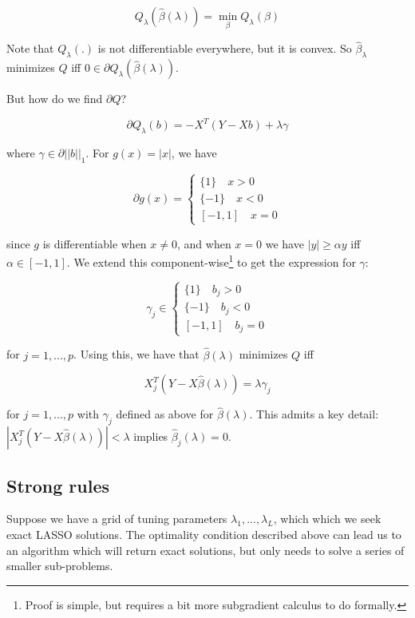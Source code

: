 \documentclass{amsart}
\begin{document}
$$Q_\lambda(\hat{\beta}(\lambda)) = \min_{\beta}Q_{\lambda}(\beta)$$

Note that $Q_{\lambda}(.)$ is not differentiable everywhere, but it is convex.
So $\hat{\beta}_{\lambda}$ minimizes $Q$ iff $0 \in \partial
Q_{\lambda}(\hat{\beta}(\lambda))$. 

\bigskip

But how do we find $\partial Q$?

$$\partial Q_{\lambda}(b) = -X^T(Y - Xb) + \lambda \gamma$$

where $\gamma \in \partial ||b||_1$. For $g(x) = |x|$, we have 

$$\partial g (x) = \begin{cases}
	\{ 1 \} \quad x > 0 \\
	\{ -1 \} \quad x < 0 \\
	[-1,1] \quad x = 0
\end{cases}$$

since $g$ is differentiable when $x \neq 0$, and when $x = 0$ we have $|y| \geq
\alpha y$ iff $\alpha \in [-1,1]$. We extend this component-wise\footnote{Proof
is simple, but requires a bit more subgradient calculus to do formally.} to get the
expression for $\gamma$:

$$\gamma_j \in \begin{cases}
	\{ 1 \} \quad b_j > 0 \\
	\{ -1 \} \quad b_j < 0 \\
	[-1,1] \quad b_j = 0
\end{cases}$$

for $j = 1, ..., p$. Using this, we have that $\hat{\beta}(\lambda)$ minimizes
$Q$ iff 

$$X^T_j(Y - X\hat{\beta}(\lambda)) = \lambda \gamma_j$$

for $j = 1, ..., p$ with $\gamma_j$ defined as above for $\hat{\beta}(\lambda)$.
This admits a key detail: $|X^T_j(Y - X\hat{\beta}(\lambda))| < \lambda$ implies
$\hat{\beta}_j(\lambda) = 0$.



\subsection{Strong rules}

Suppose we have a grid of tuning parameters $\lambda_1, ..., \lambda_L$, which
which we seek exact LASSO solutions. The optimality condition described above
can lead us to an algorithm which will return exact solutions, but only
needs to solve a series of smaller sub-problems.
\end{document}
